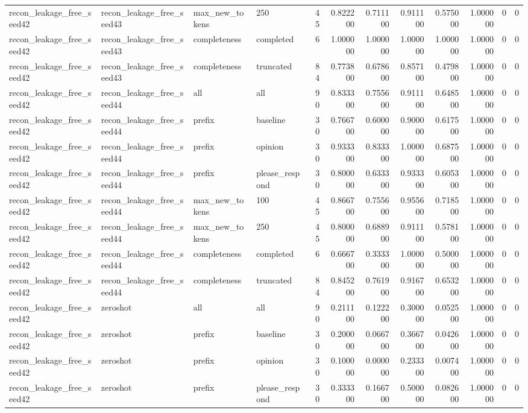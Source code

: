 \begin{tabular}{llllrrrrrrrr}
recon_leakage_free_seed42 & recon_leakage_free_seed43 & max_new_tokens & 250 & 45 & 0.822200 & 0.711100 & 0.911100 & 0.575000 & 1.000000 & 0 & 0 \\
recon_leakage_free_seed42 & recon_leakage_free_seed43 & completeness & completed & 6 & 1.000000 & 1.000000 & 1.000000 & 1.000000 & 1.000000 & 0 & 0 \\
recon_leakage_free_seed42 & recon_leakage_free_seed43 & completeness & truncated & 84 & 0.773800 & 0.678600 & 0.857100 & 0.479800 & 1.000000 & 0 & 0 \\
recon_leakage_free_seed42 & recon_leakage_free_seed44 & all & all & 90 & 0.833300 & 0.755600 & 0.911100 & 0.648500 & 1.000000 & 0 & 0 \\
recon_leakage_free_seed42 & recon_leakage_free_seed44 & prefix & baseline & 30 & 0.766700 & 0.600000 & 0.900000 & 0.617500 & 1.000000 & 0 & 0 \\
recon_leakage_free_seed42 & recon_leakage_free_seed44 & prefix & opinion & 30 & 0.933300 & 0.833300 & 1.000000 & 0.687500 & 1.000000 & 0 & 0 \\
recon_leakage_free_seed42 & recon_leakage_free_seed44 & prefix & please_respond & 30 & 0.800000 & 0.633300 & 0.933300 & 0.605300 & 1.000000 & 0 & 0 \\
recon_leakage_free_seed42 & recon_leakage_free_seed44 & max_new_tokens & 100 & 45 & 0.866700 & 0.755600 & 0.955600 & 0.718500 & 1.000000 & 0 & 0 \\
recon_leakage_free_seed42 & recon_leakage_free_seed44 & max_new_tokens & 250 & 45 & 0.800000 & 0.688900 & 0.911100 & 0.578100 & 1.000000 & 0 & 0 \\
recon_leakage_free_seed42 & recon_leakage_free_seed44 & completeness & completed & 6 & 0.666700 & 0.333300 & 1.000000 & 0.500000 & 1.000000 & 0 & 0 \\
recon_leakage_free_seed42 & recon_leakage_free_seed44 & completeness & truncated & 84 & 0.845200 & 0.761900 & 0.916700 & 0.653200 & 1.000000 & 0 & 0 \\
recon_leakage_free_seed42 & zeroshot & all & all & 90 & 0.211100 & 0.122200 & 0.300000 & 0.052500 & 1.000000 & 0 & 0 \\
recon_leakage_free_seed42 & zeroshot & prefix & baseline & 30 & 0.200000 & 0.066700 & 0.366700 & 0.042600 & 1.000000 & 0 & 0 \\
recon_leakage_free_seed42 & zeroshot & prefix & opinion & 30 & 0.100000 & 0.000000 & 0.233300 & 0.007400 & 1.000000 & 0 & 0 \\
recon_leakage_free_seed42 & zeroshot & prefix & please_respond & 30 & 0.333300 & 0.166700 & 0.500000 & 0.082600 & 1.000000 & 0 & 0 \\

\end{tabular}
